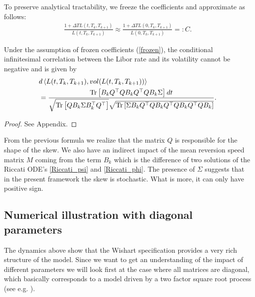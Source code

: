To preserve analytical tractability, we freeze the coefficients and approximate as follows:
\begin{align}
\frac{1+\Delta T L(t,T_k,T_{k+1})}{L(t,T_k,T_{k+1})}\approx \frac{1+\Delta T L(0,T_k,T_{k+1})}{L(0,T_k,T_{k+1})}=:C.
\label{frozen}\end{align}

\begin{proposition}
Under the assumption of frozen coefficients (\ref{frozen}), 
the conditional infinitesimal correlation between the Libor rate and its volatility cannot be negative and is given by 
\begin{align}
&d\left\langle  L(t,T_k,T_{k+1}), vol(L(t,T_k,T_{k+1}))\right\rangle\nonumber\\
&=\frac{\textup{Tr}\left[B_kQ^{\top}QB_kQ^{\top}QB_k\Sigma\right]dt}{\sqrt{\textup{Tr}\left[QB_k\Sigma B_k^{\top}Q^{\top}\right]}\sqrt{\textup{Tr}\left[\Sigma B_kQ^{\top}QB_kQ^{\top}QB_kQ^{\top}QB_k \right]}}.
\end{align}
\label{propskew}\end{proposition}

\begin{proof} See Appendix. \end{proof}





From the previous formula we realize that the matrix $Q$ is responsible for the shape of the skew. We also have an indirect impact of the mean reversion speed matrix $M$ coming from the term $B_k$ which is the difference of two solutions of the Riccati ODE's \eqref{Riccati_psi} and \eqref{Riccati_phi}. The presence of $\Sigma$ suggests that in the present framework the skew is stochastic. What is more, it can only have positive sign.

\subsection{Numerical illustration with diagonal parameters}
The dynamics above show that the Wishart specification provides a very rich structure of the model. Since we want to get an understanding of the impact of different parameters we will look first at the case where all matrices are diagonal, which basically corresponds to a model driven by a two factor square root process (see e.g. \cite{dafgra11}).

